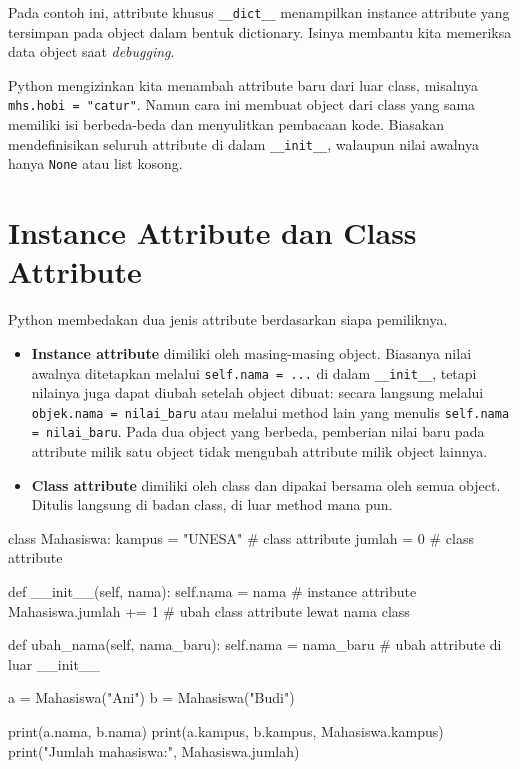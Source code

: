 Pada contoh ini, attribute khusus \texttt{\_\_dict\_\_} menampilkan instance attribute yang tersimpan pada object dalam bentuk dictionary. Isinya membantu kita memeriksa data object saat \emph{debugging}.

\begin{penting}
Python mengizinkan kita menambah attribute baru dari luar class, misalnya \texttt{mhs.hobi = "catur"}. Namun cara ini membuat object dari class yang sama memiliki isi berbeda-beda dan menyulitkan pembacaan kode. Biasakan mendefinisikan seluruh attribute di dalam \texttt{\_\_init\_\_}, walaupun nilai awalnya hanya \texttt{None} atau list kosong.
\end{penting}

\section{Instance Attribute dan Class Attribute}

Python membedakan dua jenis attribute berdasarkan siapa pemiliknya.

\begin{itemize}
  \item \textbf{Instance attribute} dimiliki oleh masing-masing object. Biasanya nilai awalnya ditetapkan melalui \texttt{self.nama = ...} di dalam \texttt{\_\_init\_\_}, tetapi nilainya juga dapat diubah setelah object dibuat: secara langsung melalui \texttt{objek.nama = nilai\_baru} atau melalui method lain yang menulis \texttt{self.nama = nilai\_baru}. Pada dua object yang berbeda, pemberian nilai baru pada attribute milik satu object tidak mengubah attribute milik object lainnya.
  \item \textbf{Class attribute} dimiliki oleh class dan dipakai bersama oleh semua object. Ditulis langsung di badan class, di luar method mana pun.
\end{itemize}

\begin{kode}
class Mahasiswa:
    kampus = "UNESA"     # class attribute
    jumlah = 0           # class attribute

    def __init__(self, nama):
        self.nama = nama          # instance attribute
        Mahasiswa.jumlah += 1     # ubah class attribute lewat nama class

    def ubah_nama(self, nama_baru):
        self.nama = nama_baru     # ubah attribute di luar __init__

a = Mahasiswa("Ani")
b = Mahasiswa("Budi")

print(a.nama, b.nama)
print(a.kampus, b.kampus, Mahasiswa.kampus)
print("Jumlah mahasiswa:", Mahasiswa.jumlah)
\end{kode}

